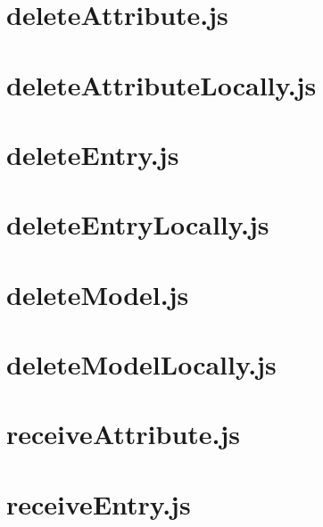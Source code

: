 \documentclass[a4paper,landscape]{report}
\begin{document}
\section{deleteAttribute.js}


\newpage
\section{deleteAttributeLocally.js}


\newpage
\section{deleteEntry.js}


\newpage
\section{deleteEntryLocally.js}


\newpage
\section{deleteModel.js}


\newpage
\section{deleteModelLocally.js}


\newpage
\section{receiveAttribute.js}


\newpage
\section{receiveEntry.js}

\end{document}
